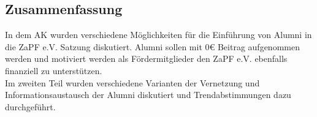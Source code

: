   \subsection*{Zusammenfassung}
    In dem AK wurden verschiedene Möglichkeiten für die Einführung von Alumni in die ZaPF e.V. Satzung diskutiert. Alumni sollen mit $0 \euro$ Beitrag aufgenommen werden und motiviert werden als Fördermitglieder den ZaPF e.V. ebenfalls finanziell zu unterstützen. \\
    Im zweiten Teil wurden verschiedene Varianten der Vernetzung und Informationsaustausch der Alumni diskutiert und Trendabstimmungen dazu durchgeführt.
